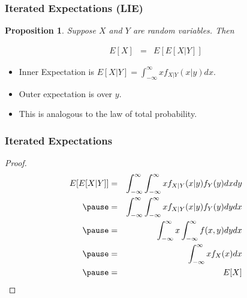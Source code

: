 \documentclass{beamer}
\newtheorem{prop}{Proposition}
\numberwithin{equation}{section}
\begin{document}
\begin{frame}
\frametitle{Iterated Expectations (LIE)}

\begin{prop}
Suppose $X$ and $Y$ are random variables.  Then 

\begin{eqnarray}
E[X] & = & E[E[X|Y]] \nonumber 
\end{eqnarray}




\end{prop}


\begin{itemize}
\item[-] Inner Expectation is $E[X|Y] = \int_{-\infty}^{\infty} x f_{X|Y} (x|y) dx$.  
\item[-] Outer expectation is over $y$.  
\item[-] This is analogous to the law of total probability.
\end{itemize}


\end{frame}


\begin{frame}
\frametitle{Iterated Expectations}

\pause 
\begin{proof}
\begin{eqnarray}
E[E[X|Y]] & = & \int_{-\infty}^{\infty}  \int_{-\infty}^{\infty} x f_{X|Y} (x|y) f_{Y}(y) dx dy \nonumber \\ \pause 
&= & \int_{-\infty}^{\infty}  \int_{-\infty}^{\infty} x f_{X|Y} (x|y) f_{Y}(y) dy dx \nonumber \\ \pause 
& = & \int_{-\infty}^{\infty} x \int_{-\infty}^{\infty}  f(x, y) dy dx  \nonumber \\ \pause 
& = & \int_{-\infty}^{\infty}  x f_{X}(x) dx  \nonumber \\ \pause 
& =& E[X] \nonumber 
\end{eqnarray}



\end{proof}
\end{frame}
\end{document}
